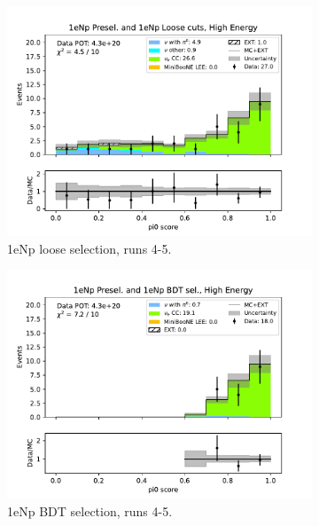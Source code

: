 \begin{figure}[H]
\begin{subfigure}{0.33\linewidth}
    \includegraphics[width=\linewidth]{technote/Sidebands/Figures/FarSideband/far_sideband_pi0_score_run4b4c4d5_NP_NPL_HIGH_ENERGY.pdf}
    \caption{1eNp loose selection, runs 4-5.}
    \end{subfigure}%
    \begin{subfigure}{0.33\linewidth}
    \includegraphics[width=\linewidth]{technote/Sidebands/Figures/FarSideband/far_sideband_pi0_score_run4b4c4d5_NP_NPBDT_HIGH_ENERGY.pdf}
    \caption{1eNp BDT selection, runs 4-5.}
    \end{subfigure}
    \begin{subfigure}{0.33\linewidth}

\end{subfigure}
\end{figure}
